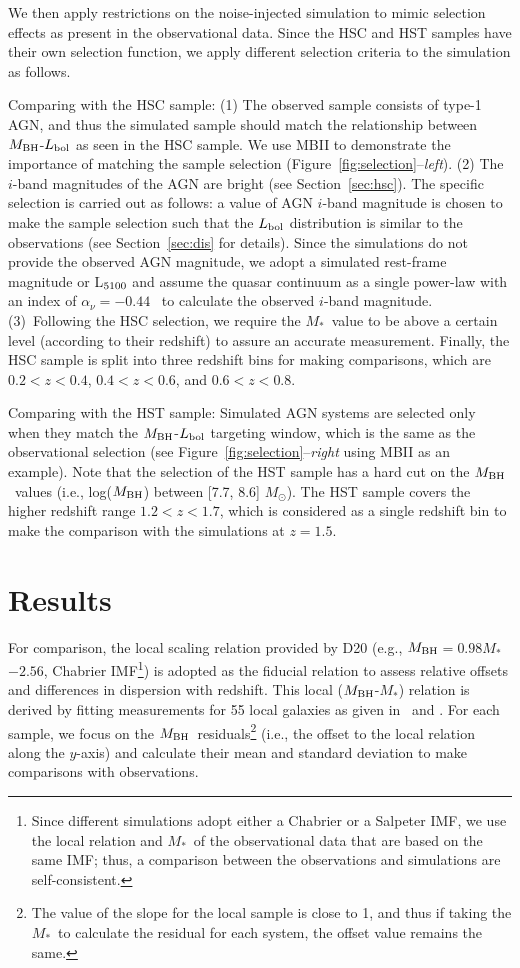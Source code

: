 \documentclass[twocolumn]{aastex631}
\def\smass{{$M_*$}}
\def\mbh{$M_{\rm BH}$}
\begin{document}
We then apply restrictions on the noise-injected simulation to mimic selection effects as present in the observational data. Since the HSC and HST samples have their own selection function, we apply different selection criteria to the simulation as follows.

Comparing with the HSC sample: (1) The observed sample consists of type-1 AGN, and thus the simulated sample should match the relationship between \mbh-$L_{\rm bol}$ as seen in the HSC sample. We use MBII to demonstrate the importance of matching the sample selection (Figure~\ref{fig:selection}--{\it left}). (2) The $i$-band magnitudes of the AGN are bright (see Section~\ref{sec:hsc}). 
The specific selection is carried out as follows: a value of AGN $i$-band magnitude is chosen to make the sample selection such that the $L_{\rm bol}$ distribution is similar to the observations (see Section~\ref{sec:dis} for details).
Since the simulations do not provide the observed AGN magnitude, we adopt a simulated rest-frame magnitude or L$_{\rm 5100}$ and assume the quasar continuum as a single power-law with an index of $\alpha_\nu=-0.44$~\citep{2001AJ....122..549V} to calculate the observed $i$-band magnitude.
 (3)~Following the HSC selection, we require the \smass\ value to be above a certain level (according to their redshift) to assure an accurate measurement. Finally, the HSC sample is split into three redshift bins for making comparisons, which are $0.2<z<0.4$, $0.4<z<0.6$, and $0.6<z<0.8$.
 
Comparing with the HST sample: Simulated AGN systems are selected only when they match the  \mbh-$L_{\rm bol}$ targeting window, which is the same as the observational selection (see Figure~\ref{fig:selection}--{\it right} using MBII as an example). Note that the selection of the HST sample has a hard cut on the \mbh\ values (i.e., log(\mbh) between [7.7, 8.6] $M_{\odot}$). The HST sample covers the higher redshift range $1.2<z<1.7$, which is considered as a single redshift bin to make the comparison with the simulations at $z=1.5$.



\section{Results} \label{sec:result}
For comparison, the local scaling relation provided by  D20 (e.g., \mbh$=0.98$\smass$-2.56$, Chabrier IMF\footnote{Since different simulations adopt either a Chabrier or a Salpeter IMF, we use the local relation and \smass\ of the observational data that are based on the same IMF; thus, a comparison between the observations and simulations are self-consistent.}) is adopted as the fiducial relation to assess relative offsets and differences in dispersion with redshift. This local (\mbh-\smass) relation is derived by fitting measurements for 55 local galaxies as given in~\citet{Bennert++2011} and \citet{H+R04}.
For each sample, we focus on the \mbh\ residuals\footnote{The value of the slope for the local sample is close to 1, and thus if taking the \smass\ to calculate the residual for each system, the offset value remains the same.} (i.e., the offset to the local relation along the $y$-axis) and calculate their mean and standard deviation to make comparisons with observations.
\end{document}
